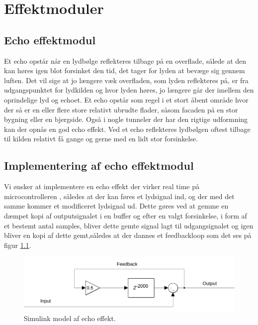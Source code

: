 \chapter{Effektmoduler}\label{chap:DSP}

\section{Echo effektmodul}\label{sec:echo}
Et echo opstår når en lydbølge reflekteres tilbage på en overflade, sålede at den kan høres igen blot forsinket den tid, det tager for lyden at bevæge sig gennem luften.
Det vil sige at jo længere væk overfladen, som lyden reflekteres på, er fra udgangspunktet for lydkilden og hvor lyden høres, jo længere går der imellem den oprindelige lyd og echoet.
Et echo opstår som regel i et stort åbent område hvor der så er en eller flere store relativt ubrudte flader, såsom facaden på en stor bygning eller en bjergside.
Også i nogle tunneler der har den rigtige udformning kan der opnås en god echo effekt.
Ved et echo reflekteres lydbølgen oftest tilbage til kilden relativt få gange og gerne med en lidt stor forsinkelse.

\section{Implementering af echo effektmodul}
Vi ønsker at implementere en echo effekt der virker real time på microcontrolleren , således at der kan føres et lydsignal ind, og der med det samme kommer et modificeret lydsignal ud.
Dette gøres ved at gemme en dæmpet kopi af outputsignalet i en buffer og efter en valgt forsinkelse, i form af et bestemt antal samples, bliver dette gemte signal lagt til udgangsignalet og igen bliver en kopi af dette gemt,således at der dannes et feedbackloop som det ses på figur \ref{fig:echo_simulink}.
\begin{figure}[h]
	\includegraphics[width=0.8\linewidth]{./billeder/Echo_simulink.png}
	\caption{Simulink model af echo effekt.}
	\label{fig:echo_simulink}
\end{figure}

